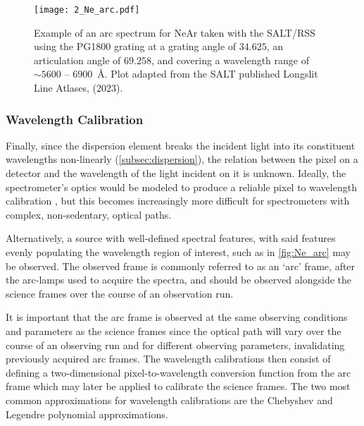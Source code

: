 \begin{figure}[t]
    \centering
    \texttt{[image: 2\_Ne\_arc.pdf]}
    \caption{
        Example of an arc spectrum for NeAr taken with the \gls{SALT}/\gls{RSS} using the PG1800 grating at a grating angle of $34.625$\degree, an articulation angle of $69.258$\degree, and covering a wavelength range of $\sim 5600$ -- $6900$~\AA.
        Plot adapted from the \gls{SALT} published Longslit Line Atlases, (2023).\protect\footnotemark
    }
    \label{fig:Ne_arc}
\end{figure}

\subsubsection{Wavelength Calibration}

Finally, since the dispersion element breaks the incident light into its constituent wavelengths non-linearly (\autoref{subsec:dispersion}), the relation between the pixel on a detector and the wavelength of the light incident on it is unknown.
Ideally, the spectrometer's optics would be modeled to produce a reliable pixel to wavelength calibration \citep[see e.g.,][]{WavCalSpectraModel}, but this becomes increasingly more difficult for spectrometers with complex, non-sedentary, optical paths.

Alternatively, a source with well-defined spectral features, with said features evenly populating the wavelength region of interest, such as in \autoref{fig:Ne_arc} may be observed.
The observed frame is commonly referred to as an `arc' frame, after the arc-lamps used to acquire the spectra, and should be observed alongside the science frames over the course of an observation run.

It is important that the arc frame is observed at the same observing conditions and parameters as the science frames since the optical path will vary over the course of an observing run and for different observing parameters, invalidating previously acquired arc frames.
The wavelength calibrations then consist of defining a two-dimensional pixel-to-wave\-length conversion function from the arc frame which may later be applied to calibrate the science frames.
The two most common approximations for wavelength calibrations are the Chebyshev and Legendre polynomial approximations.

